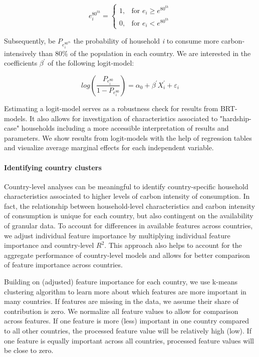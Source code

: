 \documentclass[12pt, a4paper]{article}
\begin{document}
\begin{equation}
    e_{i}^{80^{th}} =
    \begin{cases}
    1, & \text{for }  e_{i} \geq e^{80^{th}} \\
    0, & \text{for }  e_{i} < e^{80^{th}}
    \end{cases}
\end{equation}

Subsequently, be $P_{e_{i}^{80^{th}}}$ the probability of household \textit{i} to consume more carbon-intensively than 80\% of the population in each country. We are interested in the coefficients $\beta^{'}$ of the following logit-model:

\begin{equation}
    log \left( \frac{P_{e_{i}^{80}}}{1 - P_{e_{i}^{80}}} \right) = \alpha_{0} + \beta^{'} X_{i}^{'} + \varepsilon_{i}
\end{equation}

Estimating a logit-model serves as a robustness check for results from BRT-models. It also allows for investigation of characteristics associated to "hardship-case" households including a more accessible interpretation of results and parameters. We show results from logit-models with the help of regression tables and visualize average marginal effects for each independent variable.

\paragraph{Identifying country clusters} Country-level analyses can be meaningful to identify country-specific household characteristics associated to higher levels of carbon intensity of consumption. In fact, the relationship between household-level characteristics and carbon intensity of consumption is unique for each country, but also contingent on the availability of granular data. To account for differences in available features across countries, we adjust individual feature importance by multiplying individual feature importance and country-level $R^{2}$. This approach also helps to account for the aggregate performance of country-level models and allows for better comparison of feature importance across countries.

Building on (adjusted) feature importance for each country, we use k-means clustering algorithm to learn more about which features are more important in many countries. If features are missing in the data, we assume their share of contribution is zero. We normalize all feature values to allow for comparison across features. If one feature is more (less) important in one country compared to all other countries, the processed feature value will be relatively high (low). If one feature is equally important across all countries, processed feature values will be close to zero.
\end{document}
